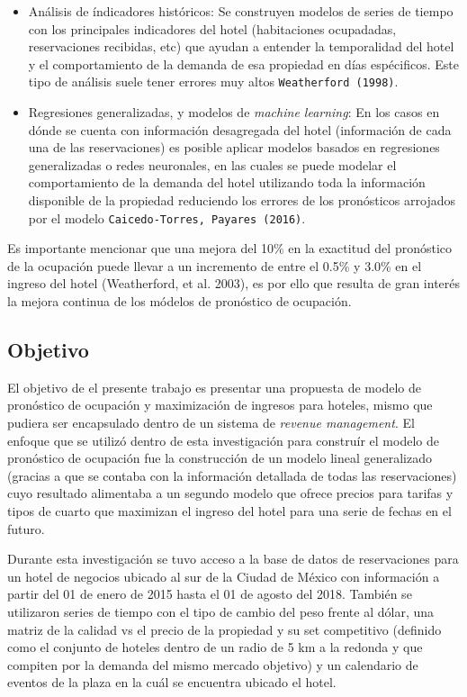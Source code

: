 \begin{itemize}
  \item Análisis de índicadores históricos: Se construyen modelos de series de tiempo con los principales indicadores del hotel (habitaciones ocupadadas, reservaciones recibidas, etc) que ayudan a entender la temporalidad del hotel y el comportamiento de la demanda de esa propiedad en días espécificos. Este tipo de análisis suele tener errores muy altos \texttt{Weatherford (1998)}.
  \item Regresiones generalizadas, y modelos de \emph{machine learning}: En los casos en dónde se cuenta con información desagregada del hotel (información de cada una de las reservaciones) es posible aplicar modelos basados en regresiones generalizadas o redes neuronales, en las cuales se puede modelar el comportamiento de la demanda del hotel utilizando toda la información disponible de la propiedad reduciendo los errores de los pronósticos arrojados por el modelo \texttt{Caicedo-Torres, Payares (2016)}.
\end{itemize}
Es importante mencionar que una mejora del 10\% en la exactitud del pronóstico de la ocupación puede llevar a un incremento de entre el 0.5\% y 3.0\% en el ingreso del hotel (Weatherford, et al. 2003), es por ello que resulta de gran interés la mejora continua de los módelos de pronóstico de ocupación.
\subsection*{Objetivo}
El objetivo de el presente trabajo es presentar una propuesta de modelo de pronóstico de ocupación y maximización de ingresos para hoteles, mismo que pudiera ser encapsulado dentro de un sistema de \emph{revenue management}. El enfoque que se utilizó dentro de esta investigación para construír el modelo de pronóstico de ocupación fue la construcción de un modelo lineal generalizado (gracias a que se contaba con la información detallada de todas las reservaciones) cuyo resultado alimentaba a un segundo modelo que ofrece precios para tarifas y tipos de cuarto que maximizan el ingreso del hotel para una serie de fechas en el futuro.

Durante esta investigación se tuvo acceso a la base de datos de reservaciones para un hotel de negocios ubicado al sur de la Ciudad de México con información a partir del 01 de enero de 2015 hasta el 01 de agosto del 2018. También se utilizaron series de tiempo con el tipo de cambio del peso frente al dólar, una matriz de la calidad vs el precio de la propiedad y su set competitivo (definido como el conjunto de hoteles dentro de un radio de 5 km a la redonda y que compiten por la demanda del mismo mercado objetivo) y un calendario de eventos de la plaza en la cuál se encuentra ubicado el hotel.

